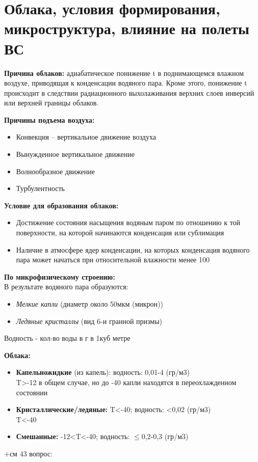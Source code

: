 
\section{Облака, условия формирования, микроструктура, влияние на полеты ВС}
\textbf{Причина облаков:} адиабатическое понижение t в поднимающемся влажном воздухе, приводящая к конденсации водяного пара. Кроме этого, понижение t происходит в следствии радиационного выхолаживания верхних слоев инверсий или верхней границы облаков.

\par \textbf{Причины подъема воздуха:}
\begin{itemize}
	\item Конвекция – вертикальное движение воздуха
	\item Вынужденное вертикальное движение
	\item Волнообразное движение
	\item Турбулентность
\end{itemize}
\textbf{Условие для образования облаков:}
\begin{itemize}
	\item Достижение состояния насыщения водяным паром по отношению к той поверхности, на которой начинаются конденсация или сублимация
	\item Наличие в атмосфере ядер конденсации, на которых конденсация водяного пара может начаться при относительной влажности менее 100%
\end{itemize}

\textbf{По микрофизическому строению:}\\
В результате водяного пара образуются:

\begin{itemize}
	\item \textit{Мелкие капли} (диаметр около 50мкм (микрон))
	\item \textit{Ледяные кристаллы} (вид 6-и гранной призмы)
\end{itemize}

Водность - кол-во воды в г в 1куб метре\\
\par \textbf{Облака:}
\begin{itemize}
	\item \textbf{Капельножидкие} (из капель): водность: 0,01-4 (гр/м3)\\
	T>-12 в общем случае, но до -40 капли находятся в переохлажденном состоянии
	\item \textbf{Кристаллические/ледяные:} T<-40; водность: <0,02 (гр/м3)\\
	T<-40
	\item \textbf{Смешанные:} -12<T<-40; водность: $\leqslant$0,2-0,3 (гр/м3)\\
\end{itemize}

+см 43 вопрос:
